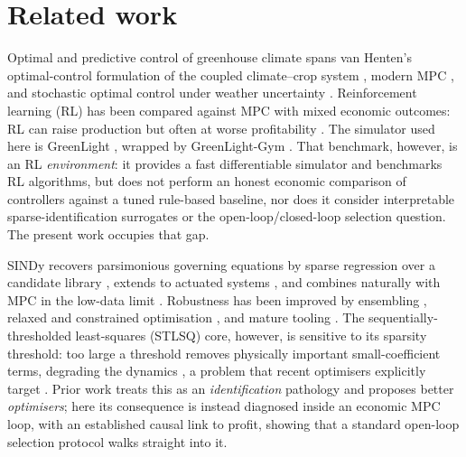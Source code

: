 \documentclass[preprint,3p]{elsarticle}
\begin{document}
\section{Related work}
\label{sec:related}

Optimal and predictive control of greenhouse climate spans van Henten's
optimal-control formulation of the coupled climate--crop system
\citep{vanhenten1994thesis,vanhenten2009timescale}, modern MPC
\citep{lin2021greenhousempc,chenyou2020ddrmpc}, and stochastic optimal control under
weather uncertainty \citep{vanmourik2023stochastic}. Reinforcement learning (RL) has
been compared against MPC with mixed economic outcomes: RL can raise production but
often at worse profitability
\citep{morcego2023rlvsmpc,mallick2024rlmpc,adaptiverobust2025greenhouse}. The
simulator used here is GreenLight \citep{katzin2020greenlight,katzin2021led}, wrapped
by GreenLight-Gym \citep{vanlaatum2025greenlightgym}. That benchmark, however, is an
RL \emph{environment}: it provides a fast differentiable simulator and benchmarks RL
algorithms, but does not perform an honest economic comparison of controllers against
a tuned rule-based baseline, nor does it consider interpretable sparse-identification
surrogates or the open-loop/closed-loop selection question. The present work occupies
that gap.

SINDy recovers parsimonious governing equations by sparse regression over a candidate
library \citep{brunton2016sindy}, extends to actuated systems \citep{brunton2016sindyc},
and combines naturally with MPC in the low-data limit \citep{kaiser2018sindympc}.
Robustness has been improved by ensembling \citep{fasel2022ensemble}, relaxed and
constrained optimisation \citep{champion2020sr3}, and mature tooling
\citep{desilva2020pysindy,kaptanoglu2022pysindy}. The sequentially-thresholded
least-squares (STLSQ) core, however, is sensitive to its sparsity threshold: too
large a threshold removes physically important small-coefficient terms, degrading the
dynamics \citep{cortiella2021sparse,mangan2017modelselection}, a problem that recent
optimisers explicitly target \citep{balanceguided2026}. Prior work treats this as an
\emph{identification} pathology and proposes better \emph{optimisers}; here its
consequence is instead diagnosed inside an economic MPC loop, with an established
causal link to profit, showing that a standard open-loop selection protocol walks
straight into it.
\end{document}
